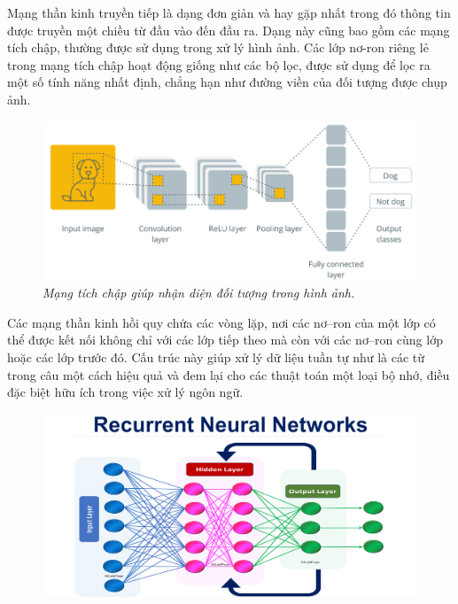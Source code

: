 \begin{multicols}{2}
	Mạng thần kinh truyền tiếp là dạng đơn giản và hay gặp nhất trong đó thông tin được truyền một chiều từ đầu vào đến đầu ra. Dạng này cũng bao gồm các mạng tích chập, thường được sử dụng trong xử lý hình ảnh. Các lớp nơ-ron riêng lẻ trong mạng tích chập hoạt động giống như các bộ lọc, được sử dụng để lọc ra một số tính năng nhất định, chẳng hạn như đường viền của đối tượng được chụp ảnh. 
	\begin{figure}[H]
		\vspace*{-5pt}
		\centering
		\captionsetup{labelformat= empty, justification=centering}
		\includegraphics[width= 1\linewidth]{cnn_architecture.png}
		\caption{\small\textit{\color{timhieukhoahoc}Mạng tích chập giúp nhận diện đối tượng trong hình ảnh.}}
		\vspace*{-10pt}
	\end{figure}
	Các mạng thần kinh hồi quy chứa các vòng lặp, nơi các nơ--ron của một lớp có thể được kết nối không chỉ với các lớp tiếp theo mà còn với các nơ--ron cùng lớp hoặc các lớp trước đó. Cấu trúc này giúp xử lý dữ liệu tuần tự như là các từ trong câu một cách hiệu quả và đem lại cho các thuật toán một loại bộ nhớ, điều đặc biệt hữu ích trong việc xử lý ngôn ngữ.
	\begin{figure}[H]
		\vspace*{-5pt}
		\centering
		\captionsetup{labelformat= empty, justification=centering}
		\includegraphics[width= 1\linewidth]{RNN.png}

\end{figure}
\end{multicols}

